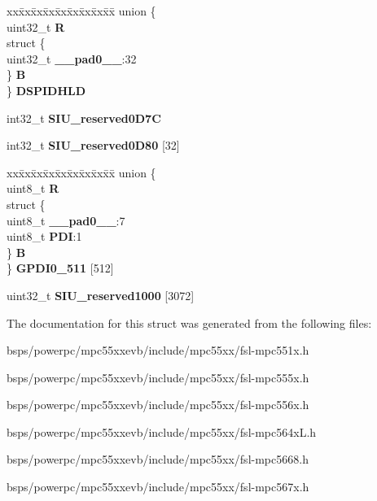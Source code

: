 \begin{DoxyCompactItemize}
\begin{tabbing}
\end{tabbing}\item 
\mbox{\label{structSIU__tag_aa8588df12943e90a653a8329ea983d46}} 
\begin{tabbing}
xx\=xx\=xx\=xx\=xx\=xx\=xx\=xx\=xx\=\kill
union \{\\
\>uint32\_t {\bfseries R}\\
\>struct \{\\
\>\>uint32\_t {\bfseries \_\_pad0\_\_}:32\\
\>\} {\bfseries B}\\
\} {\bfseries DSPIDHLD}\\

\end{tabbing}\item 
\mbox{\label{structSIU__tag_ac12e6f33ab671721cbdb89c92079ceac}} 
int32\+\_\+t {\bfseries S\+I\+U\+\_\+reserved0\+D7C}
\item 
\mbox{\label{structSIU__tag_a7deeaa1c73cddc7b578c801bf8867820}} 
int32\+\_\+t {\bfseries S\+I\+U\+\_\+reserved0\+D80} \mbox{[}32\mbox{]}
\item 
\mbox{\label{structSIU__tag_abcdc94714490e4b8cdb9b635d85d112f}} 
\begin{tabbing}
xx\=xx\=xx\=xx\=xx\=xx\=xx\=xx\=xx\=\kill
union \{\\
\>uint8\_t {\bfseries R}\\
\>struct \{\\
\>\>uint8\_t {\bfseries \_\_pad0\_\_}:7\\
\>\>uint8\_t {\bfseries PDI}:1\\
\>\} {\bfseries B}\\
\} {\bfseries GPDI0\_511} \mbox{[}512\mbox{]}\\

\end{tabbing}\item 
\mbox{\label{structSIU__tag_a1476a22a48852737bd5c25035b8a7e5e}} 
uint32\+\_\+t {\bfseries S\+I\+U\+\_\+reserved1000} \mbox{[}3072\mbox{]}
\end{DoxyCompactItemize}


The documentation for this struct was generated from the following files\+:\begin{DoxyCompactItemize}
\item 
bsps/powerpc/mpc55xxevb/include/mpc55xx/fsl-\/mpc551x.\+h\item 
bsps/powerpc/mpc55xxevb/include/mpc55xx/fsl-\/mpc555x.\+h\item 
bsps/powerpc/mpc55xxevb/include/mpc55xx/fsl-\/mpc556x.\+h\item 
bsps/powerpc/mpc55xxevb/include/mpc55xx/fsl-\/mpc564x\+L.\+h\item 
bsps/powerpc/mpc55xxevb/include/mpc55xx/fsl-\/mpc5668.\+h\item 
bsps/powerpc/mpc55xxevb/include/mpc55xx/fsl-\/mpc567x.\+h\end{DoxyCompactItemize}
